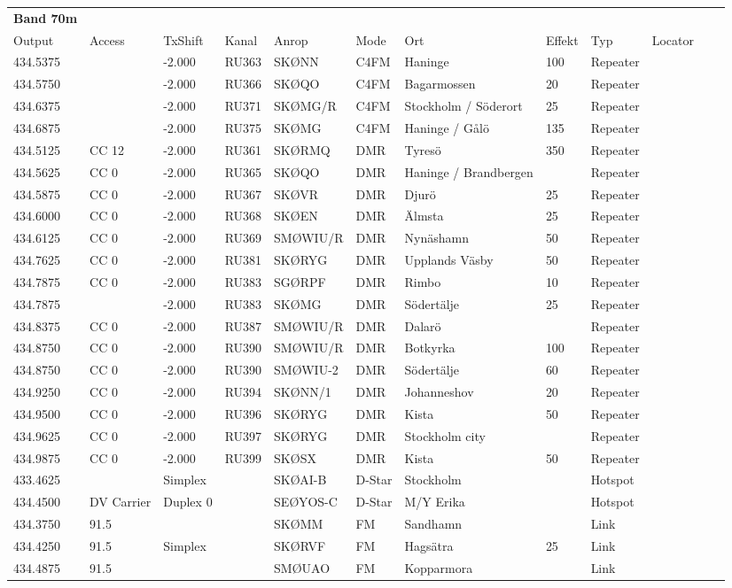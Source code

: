 \begin{longtable}[l]{lllllp{1.5cm}lp{1.5cm}lrlr}
\textbf{Band 70m} &  &  &  &  &  &  &  &  &  \\* 

Output & Access & TxShift & Kanal & Anrop & Mode & Ort & Effekt & Typ & Locator \\ \hline
434.5375&&-2.000&RU363&SKØNN&C4FM&Haninge&100&Repeater&\\
434.5750&&-2.000&RU366&SKØQO&C4FM&Bagarmossen&20&Repeater&\\
434.6375&&-2.000&RU371&SKØMG/R&C4FM&Stockholm / Söderort&25&Repeater&\\
434.6875&&-2.000&RU375&SKØMG&C4FM&Haninge / Gålö&135&Repeater&\\
434.5125&CC 12&-2.000&RU361&SKØRMQ&DMR&Tyresö&350&Repeater&\\
434.5625&CC 0&-2.000&RU365&SKØQO&DMR&Haninge / Brandbergen&&Repeater&\\
434.5875&CC 0&-2.000&RU367&SKØVR&DMR&Djurö&25&Repeater&\\
434.6000&CC 0&-2.000&RU368&SKØEN&DMR&Älmsta&25&Repeater&\\
434.6125&CC 0&-2.000&RU369&SMØWIU/R&DMR&Nynäshamn&50&Repeater&\\
434.7625&CC 0&-2.000&RU381&SKØRYG&DMR&Upplands Väsby&50&Repeater&\\
434.7875&CC 0&-2.000&RU383&SGØRPF&DMR&Rimbo&10&Repeater&\\
434.7875&&-2.000&RU383&SKØMG&DMR&Södertälje&25&Repeater&\\
434.8375&CC 0&-2.000&RU387&SMØWIU/R&DMR&Dalarö&&Repeater&\\
434.8750&CC 0&-2.000&RU390&SMØWIU/R&DMR&Botkyrka&100&Repeater&\\
434.8750&CC 0&-2.000&RU390&SMØWIU-2&DMR&Södertälje&60&Repeater&\\
434.9250&CC 0&-2.000&RU394&SKØNN/1&DMR&Johanneshov&20&Repeater&\\
434.9500&CC 0&-2.000&RU396&SKØRYG&DMR&Kista&50&Repeater&\\
434.9625&CC 0&-2.000&RU397&SKØRYG&DMR&Stockholm city&&Repeater&\\
434.9875&CC 0&-2.000&RU399&SKØSX&DMR&Kista&50&Repeater&\\
433.4625&&Simplex&&SKØAI-B&D-Star&Stockholm&&Hotspot&\\
434.4500&DV Carrier&Duplex 0&&SEØYOS-C&D-Star&M/Y Erika&&Hotspot&\\
434.3750&91.5&&&SKØMM&FM&Sandhamn&&Link&\\
434.4250&91.5&Simplex&&SKØRVF&FM&Hagsätra&25&Link&\\
434.4875&91.5&&&SMØUAO&FM&Kopparmora&&Link&\\

\end{longtable}
